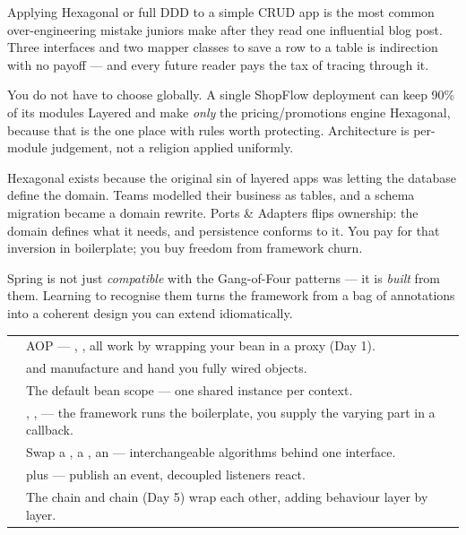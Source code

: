  Applying Hexagonal or full DDD to a simple CRUD app is the most common over-engineering mistake juniors make after they read one influential blog post. Three interfaces and two mapper classes to save a row to a table is indirection with no payoff --- and every future reader pays the tax of tracing through it.

\begin{prodtip}
You do not have to choose globally. A single ShopFlow deployment can keep 90\% of its modules Layered and make \emph{only} the pricing/promotions engine Hexagonal, because that is the one place with rules worth protecting. Architecture is per-module judgement, not a religion applied uniformly.
\end{prodtip}

\begin{whyexists}
Hexagonal exists because the original sin of layered apps was letting the database define the domain. Teams modelled their business as tables, and a schema migration became a domain rewrite. Ports \& Adapters flips ownership: the domain defines what it needs, and persistence conforms to it. You pay for that inversion in boilerplate; you buy freedom from framework churn.
\end{whyexists}


 Spring is not just \emph{compatible} with the Gang-of-Four patterns --- it is \emph{built} from them. Learning to recognise them turns the framework from a bag of annotations into a coherent design you can extend idiomatically.

\begin{center}\small
\begin{tabularx}{\linewidth}{@{}L{30mm} X@{}}
 & \\\midrule
{} & AOP --- , ,  all work by wrapping your bean in a proxy (Day 1).\\
 &  and  manufacture and hand you fully wired objects.\\
 & The default bean scope --- one shared instance per context.\\
 & , ,  --- the framework runs the boilerplate, you supply the varying part in a callback.\\
 & Swap a , a , an  --- interchangeable algorithms behind one interface.\\
 &  plus  --- publish an event, decoupled listeners react.\\
 & The  chain and  chain (Day 5) wrap each other, adding behaviour layer by layer.\\
\end{tabularx}\end{center}

